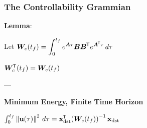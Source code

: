 \documentclass[11pt]{article}
\begin{document}
  \pagebreak

  \subsubsection{The Controllability Grammian}

  \vspace{12pt}

  \textbf{Lemma}:

  Let \(\bm{W}_c(t_f) = \displaystyle \int_0^{t_f} e^{\bm{A}\tau}\bm{B}\bm{B}^{{\mkern-1.5mu\mathsf{T}}} e^{\bm{A}^{{\mkern-1.5mu\mathsf{T}}} \tau}\,d\tau\)

  \(\bm{W}^{\mkern-1.5mu\mathsf{T}}_c(t_f) = \bm{W}_c(t_f)\)

  \vspace{6pt}

  ---

  \textbf{Minimum Energy, Finite Time Horizon}

  \(\int_0^{t_f} \left\lVert\mathbf{u}(\tau)\right\rVert^2\, d\tau =
  \mathbf{x}_{\textrm{dst}}^{{\mkern-1.5mu\mathsf{T}}} {\left( \bm{W}_c(t_f) \right)}^{-1}\, \mathbf{x}_{\textrm{dst}}\)

  \vspace{12pt}
\end{document}

